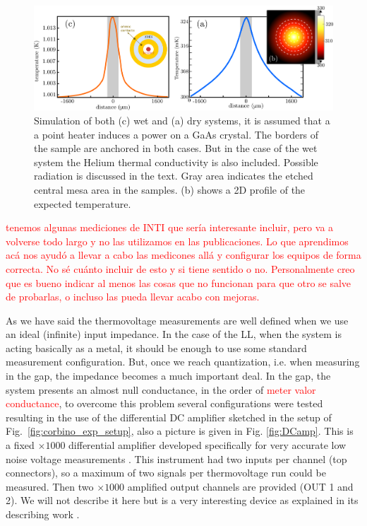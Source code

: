 \begin{figure}
    \centering
    \includegraphics[width=1\textwidth]{figures/experimental/comsol_helium_dry_and_wet.png}
    \caption{Simulation of both (c) wet and (a) dry systems, it is assumed that a a point heater induces a power on a GaAs crystal. The borders of the sample are anchored in both cases. But in the case of the wet system the Helium thermal conductivity is also included. Possible radiation is discussed in the text. Gray area indicates the etched central mesa area in the samples. (b) shows a 2D profile of the expected temperature.}
    \label{fig:comsolHelium}
\end{figure}


\textcolor{red}{tenemos algunas mediciones de INTI que sería interesante incluir, pero va a volverse todo largo y no las utilizamos en las publicaciones. Lo que aprendimos acá nos ayudó a llevar a cabo las medicones allá y configurar los equipos de forma correcta. No sé cuánto incluir de esto y si tiene sentido o no. Personalmente creo que es bueno indicar al menos las cosas que no funcionan para que otro se salve de probarlas, o incluso las pueda llevar acabo con mejoras.}

As we have said the thermovoltage measurements are well defined when we use an ideal (infinite) input impedance. In the case of the LL, when the system is acting basically as a metal, it should be enough to use some standard measurement configuration. But, once we reach quantization, i.e. when measuring in the gap, the impedance becomes a much important deal. In the gap, the system presents an almost null conductance, in the order of \textcolor{red}{meter valor conductance}, to overcome this problem several configurations were tested resulting in the use of the differential DC amplifier sketched in the setup of Fig.~\ref{fig:corbino_exp_setup}, also a picture is given in Fig. \ref{fig:DCamp}. This is a fixed $\times 1000$ differential amplifier developed specifically for very accurate low noise voltage measurements \cite{Maerki2017}. This instrument had two inputs per channel (top  connectors), so a maximum of two signals per thermovoltage run could be measured. Then two $\times 1000$ amplified output channels are provided (OUT 1 and 2). We will not describe it here but is a very interesting device as explained in its describing work \cite{Maerki2017}. 

